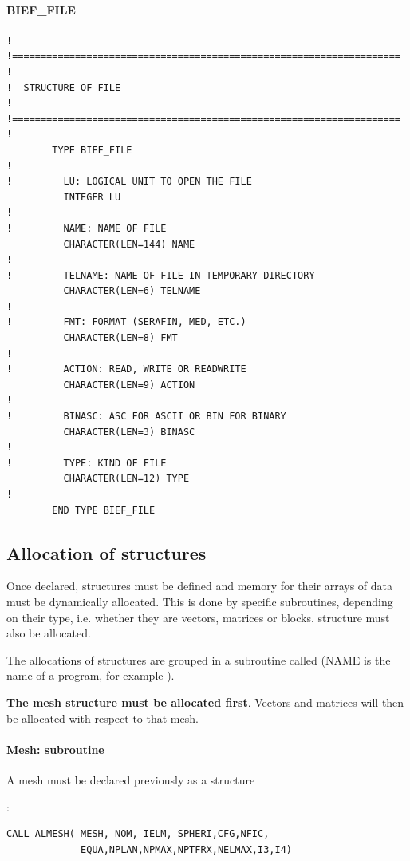 \paragraph{BIEF\_FILE}

\begin{lstlisting}[language=TelFortran]
!
!====================================================================
!
!  STRUCTURE OF FILE
!
!====================================================================
!
        TYPE BIEF_FILE
!
!         LU: LOGICAL UNIT TO OPEN THE FILE
          INTEGER LU
!
!         NAME: NAME OF FILE
          CHARACTER(LEN=144) NAME
!
!         TELNAME: NAME OF FILE IN TEMPORARY DIRECTORY
          CHARACTER(LEN=6) TELNAME
!
!         FMT: FORMAT (SERAFIN, MED, ETC.)
          CHARACTER(LEN=8) FMT
!
!         ACTION: READ, WRITE OR READWRITE
          CHARACTER(LEN=9) ACTION
!
!         BINASC: ASC FOR ASCII OR BIN FOR BINARY
          CHARACTER(LEN=3) BINASC
!
!         TYPE: KIND OF FILE
          CHARACTER(LEN=12) TYPE
!
        END TYPE BIEF_FILE
\end{lstlisting}

\subsection{Allocation of structures}

Once declared,  structures must be defined and memory for
their arrays of data must be dynamically allocated. This is done by specific
subroutines, depending on their type, i.e. whether they are vectors, matrices
or blocks.  structure must also be allocated.

The allocations of structures are grouped in a subroutine called
 (NAME is the name of a \telemacsystem program, for example
\artemis).

\textbf{The mesh structure must be allocated first}. Vectors and matrices will
then be allocated with respect to that mesh.

\paragraph{Mesh: subroutine }

A mesh must be declared previously as a  structure

:
\begin{lstlisting}[language=TelFortran]
CALL ALMESH( MESH, NOM, IELM, SPHERI,CFG,NFIC,
             EQUA,NPLAN,NPMAX,NPTFRX,NELMAX,I3,I4)
\end{lstlisting}

